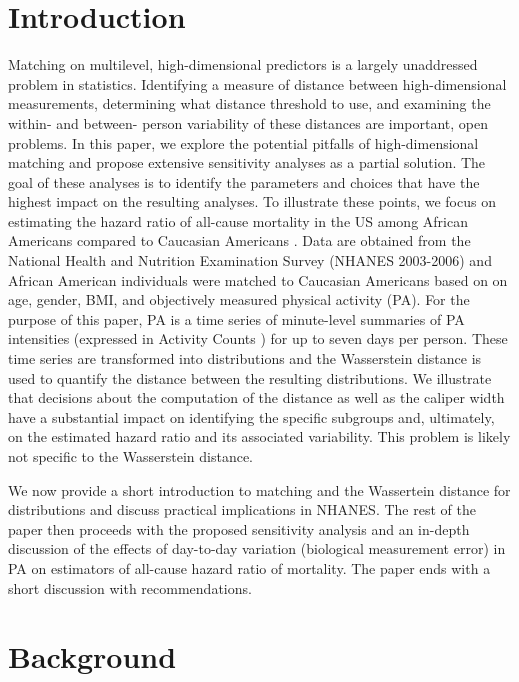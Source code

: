 \section{Introduction}
Matching on multilevel, high-dimensional predictors is a largely unaddressed problem in statistics. Identifying a measure of distance between high-dimensional measurements, determining what distance threshold to use, and examining the within- and between- person variability of these distances are important, open problems. In this paper, we explore the potential pitfalls of high-dimensional matching and propose extensive sensitivity analyses as a partial solution. The goal of these analyses is to identify the parameters and choices that have the highest impact on the resulting analyses. To illustrate these points, we focus on estimating the hazard ratio of all-cause mortality in the US among African Americans compared to Caucasian Americans \cite{benjamins_comparison_2021,beydoun_racial_2016,borrell_racialethnic_2010,luo_mortality_2021}. Data are obtained from the National Health and Nutrition Examination Survey (NHANES 2003-2006) and African American individuals were matched to Caucasian Americans based on on age, gender, BMI, and objectively measured physical activity (PA). For the purpose of this paper, PA is a time series of minute-level summaries of PA intensities (expressed in Activity Counts \cite{leroux_organizing_2019}) for up to seven days per person. These time series are transformed into distributions \cite{ghosal_predicting_2023,ghosal_distributional_2023,ghosal_scalar_2022,matabuena_distributional_2023} and the Wasserstein distance is used to quantify the distance between the resulting distributions. We illustrate that decisions about the computation of the distance as well as the caliper width have a substantial impact on identifying the specific subgroups and, ultimately, on the estimated hazard ratio and its associated variability.  This problem is likely not specific to the Wasserstein distance.  

We now provide a short introduction to matching and the Wassertein distance for distributions and discuss practical implications in NHANES. The rest of the paper then proceeds with the proposed sensitivity analysis and an in-depth discussion of the effects of day-to-day variation (biological measurement error) in PA on estimators of all-cause hazard ratio of mortality. The paper ends with a short discussion with recommendations.   


\section{Background}

